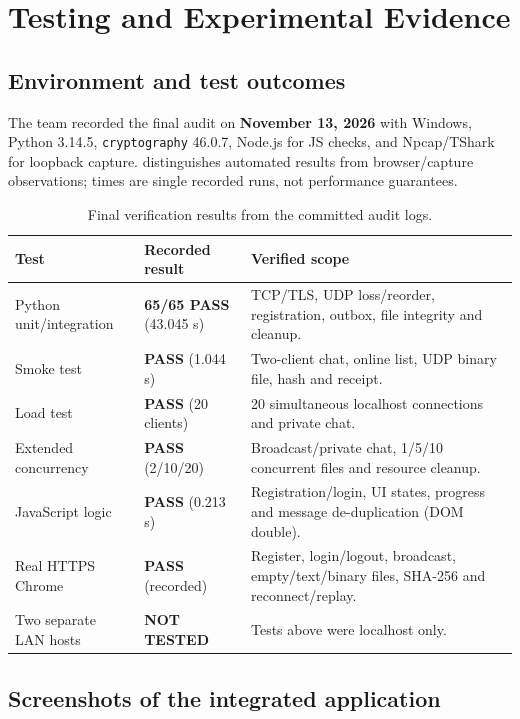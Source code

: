 \section{Testing and Experimental Evidence}
\subsection{Environment and test outcomes}

The team recorded the final audit on \textbf{November 13, 2026} with Windows, Python 3.14.5, \texttt{cryptography} 46.0.7, Node.js for JS checks, and Npcap/TShark for loopback capture.  distinguishes automated results from browser/capture observations; times are single recorded runs, not performance guarantees.

\begin{table}[H]
\centering\small
\begin{tabularx}{\linewidth}{@{}L{3.3cm}L{2.5cm}Y@{}}
\toprule
\textbf{Test} & \textbf{Recorded result} & \textbf{Verified scope} \\
\midrule
Python unit/integration & \textbf{65/65 PASS} (43.045 s) & TCP/TLS, UDP loss/reorder, registration, outbox, file integrity and cleanup. \\
Smoke test & \textbf{PASS} (1.044 s) & Two-client chat, online list, UDP binary file, hash and receipt. \\
Load test & \textbf{PASS} (20 clients) & 20 simultaneous localhost connections and private chat. \\
Extended concurrency & \textbf{PASS} (2/10/20) & Broadcast/private chat, 1/5/10 concurrent files and resource cleanup. \\
JavaScript logic & \textbf{PASS} (0.213 s) & Registration/login, UI states, progress and message de-duplication (DOM double). \\
Real HTTPS Chrome & \textbf{PASS} (recorded) & Register, login/logout, broadcast, empty/text/binary files, SHA-256 and reconnect/replay. \\
Two separate LAN hosts & \textbf{NOT TESTED} & Tests above were localhost only. \\
\bottomrule
\end{tabularx}
\caption{Final verification results from the committed audit logs.}
\label{tab:testresults}
\end{table}

\subsection{Screenshots of the integrated application}

